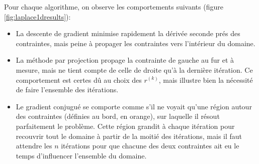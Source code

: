 \documentclass[notitlepage,oneside]{book}
\begin{document}
Pour chaque algorithme, on observe les comportements suivants (figure
\ref{fig:laplace1dresults}):
\begin{itemize}
\item La descente de gradient minimise rapidement la dérivée seconde
  prés des contraintes, mais peine à propager les contraintes vers
  l'intérieur du domaine.
\item La méthode par projection propage la contrainte de gauche au fur
  et à mesure, mais ne tient compte de celle de droite qu'à la
  dernière itération. Ce comportement est certes dû au choix des
  $r^{(k)}$, mais illustre bien la nécessité de faire l'ensemble des
  itérations.
\item Le gradient conjugué se comporte comme s'il ne voyait qu'une
  région autour des contraintes (définies au bord, en orange), sur
  laquelle il résout parfaitement le problème. Cette région grandit à
  chaque itération pour recouvrir tout le domaine à partir de la
  moitié des itérations, mais il faut attendre les $n$ itérations pour
  que chacune des deux contraintes ait eu le temps d'influencer
  l'ensemble du domaine.
\end{itemize}
	
\end{document}
